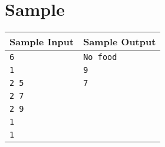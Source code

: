 \documentclass{article}
\begin{document}
\section*{Sample}

\begin{tabular}{l|l}
    \hline
    \hline
    Sample Input & Sample Output \\
    \hline
    \verb+6+ & \verb+No food+ \\
    \verb+1+ & \verb+9+ \\
    \verb+2 5+ & \verb+7+ \\
    \verb+2 7+ & \verb++ \\
    \verb+2 9+ & \verb++ \\
    \verb+1+ & \verb++ \\
    \verb+1+ & \verb++ \\
    \hline
\end{tabular}
\end{document}
